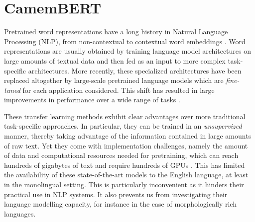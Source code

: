 

\section{CamemBERT}

Pretrained word representations have a long history in Natural Language Processing (NLP), from non-contextual \citep{brown-etal-1992-class,ando-zhang-2005-framework,mikolov-etal-2013-distributed,pennington-etal-2014-glove} to contextual word embeddings \citep{peters-etal-2018-deep,akbik-etal-2018-contextual}. Word representations are usually obtained by training language model architectures on large amounts of textual data and then fed as an input to more complex task-specific architectures. More recently, these specialized architectures have been replaced altogether by large-scale pretrained language models which are \emph{fine-tuned} for each application considered. This shift has resulted in large improvements in performance over a wide range of tasks \cite{devlin-etal-2019-bert,radford-etal-2019-language,liu-etal-2019-roberta,raffel-etal-2020-exploring}.

These transfer learning methods exhibit clear advantages over more traditional task-specific approaches. In particular, they can be trained in an \emph{unsupervized} manner, thereby taking advantage of the information contained in large amounts of raw text.
Yet they come with implementation challenges, namely the amount of data and computational resources needed for pretraining, which can reach hundreds of gigabytes of text and require hundreds of GPUs \citep{yang-etal-2019-xlnet,liu-etal-2019-roberta}. This has limited the availability of these state-of-the-art models to the English language, at least in the monolingual setting. This is particularly inconvenient as it hinders their practical use in NLP systems. It also prevents us from investigating their language modelling capacity, for instance in the case of morphologically rich languages.


